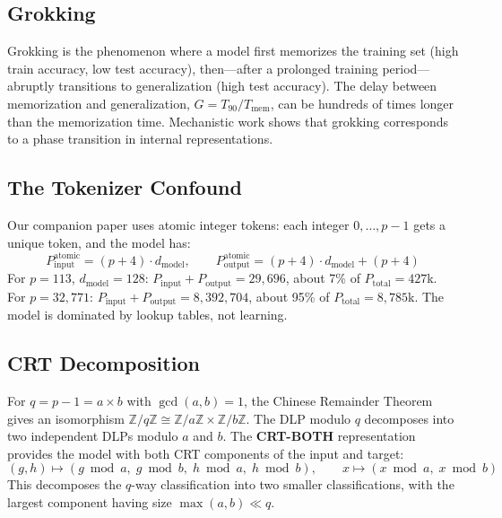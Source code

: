 \documentclass[11pt]{article}
\newcommand{\Z}{\mathbb{Z}}
\newcommand{\Tmem}{T_{\mathrm{mem}}}
\newcommand{\Tninety}{T_{90}}
\newcommand{\Gdelay}{G}
\newcommand{\Ptotal}{P_{\mathrm{total}}}
\newcommand{\Pinput}{P_{\mathrm{input}}}
\newcommand{\Poutput}{P_{\mathrm{output}}}
\newcommand{\dmodel}{d_{\mathrm{model}}}
\begin{document}
\subsection{Grokking}

Grokking \citep{power2022grokking} is the phenomenon where a model first memorizes the training set (high train accuracy, low test accuracy), then---after a prolonged training period---abruptly transitions to generalization (high test accuracy). The delay between memorization and generalization, $\Gdelay = \Tninety / \Tmem$, can be hundreds of times longer than the memorization time. Mechanistic work \citep{nanda2023progress} shows that grokking corresponds to a phase transition in internal representations.

\subsection{The Tokenizer Confound}

Our companion paper \citep{svensson2026scaling} uses atomic integer tokens: each integer $0, \ldots, p-1$ gets a unique token, and the model has:
\begin{equation}
    \Pinput^{\mathrm{atomic}} = (p + 4) \cdot \dmodel, \qquad
    \Poutput^{\mathrm{atomic}} = (p + 4) \cdot \dmodel + (p + 4)
\end{equation}
For $p = 113$, $\dmodel = 128$: $\Pinput + \Poutput = 29{,}696$, about 7\% of $\Ptotal = 427$k. For $p = 32{,}771$: $\Pinput + \Poutput = 8{,}392{,}704$, about 95\% of $\Ptotal = 8{,}785$k. The model is dominated by lookup tables, not learning.

\subsection{CRT Decomposition}

For $q = p - 1 = a \times b$ with $\gcd(a, b) = 1$, the Chinese Remainder Theorem gives an isomorphism $\Z/q\Z \cong \Z/a\Z \times \Z/b\Z$. The DLP modulo $q$ decomposes into two independent DLPs modulo $a$ and $b$. The \textbf{CRT-BOTH} representation \citep{svensson2026scaling} provides the model with both CRT components of the input and target:
\begin{equation}
    (g, h) \mapsto (g \bmod a,\; g \bmod b,\; h \bmod a,\; h \bmod b), \qquad
    x \mapsto (x \bmod a,\; x \bmod b)
\end{equation}
This decomposes the $q$-way classification into two smaller classifications, with the largest component having size $\max(a, b) \ll q$.
\end{document}
